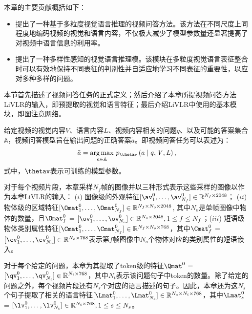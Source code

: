 本章的主要贡献概括如下：
\begin{itemize}
\item 提出了一种基于多粒度视觉语言推理的视频问答方法。该方法在不同尺度上同程度地编码视频的视觉和语言内容，不仅极大减少了模型参数量还显著提高了对视频中语言信息的利用率。
\item 提出了一种多样性感知的视觉语言推理模。该模块在多粒度视觉语言表征整合时可以有效地保持不同表征的判别性并自适应地学习不同表征的重要性，以应对多种多样的问题。
\end{itemize}




本节首先描述了视频问答任务的正式定义；然后介绍了本章所提视频问答方法LiVLR的输入，即预提取的视觉和语言特征；最后介绍LiVLR中使用的基本模块，即图注意网络。


给定视频的视觉内容$\mathit{V}$、语言内容$\mathit{L}$、视频内容相关的问题$\mathit{q}$、以及可能的答案集合$\mathbb{A}$，视频问答模型旨在输出问题的正确答案$\tilde{a}$。即视频问答任务可以表述为：
\begin{equation} 
\tilde{a} = \underset{a \in \mathbb{A}}{\arg \max}~p_{\thetav}\left(a \mid q,\mathit{V}, \mathit{L}\right), 
\end{equation} 
式中，$\thetav$表示可训练的模型参数。


对于每个视频片段，本章采样$N_f$帧的图像并以三种形式表示这些采样的图像以作为本章LiVLR的输入： 
($i$) 图像级的外观特征$[\av_{1}^{0}, \dots, \av_{N_f}^{0}] \in \mathbb{R}^{N_f \times \text{2048}}$； ($ii$) 物体级的区域特征$[\Omat_{1}^{0}, \dots, \Omat_{N_f}^{0}] \in \mathbb{R}^{N_f \times N_o \times \text{2048}}$, 其中$N_o$是单帧图像中物体的数量，且$\Omat_f^{0}$ = $[\ov_1^{0}, \dots, \ov_{N_o}^{0}] \in \mathbb{R}^{N_o \times \text{2048}}, 1\leq f\leq N_f$；($iii$) 短语级物体类别属性特征$[\Cmat_{1}^{0}, \dots, \Cmat_{N_f}^{0}]\in \mathbb{R}^{N_f \times N_o \times \text{768}}$，其中$\Cmat_f^{0}$ = $[\cv_1^{0}, \dots, \cv_{N_o}^{0}] \in \mathbb{R}^{N_o \times \text{768}}$表示第$f$帧图像中$N_o$个物体对应的类别属性的短语嵌入。


对于每个给定的问题，本章为其提取了token级的特征$\Qmat^{0}$ = $[\qv_1^{0}, \dots, \qv_{N_t}^{0}] \in \mathbb{R}^{N_t \times \text{768}}$，其中$N_t$表示该问题句子中token的数量。除了给定的问题之外，每个视频片段还有$N_s$个对应的语言描述的句子。因此，本章还为这$N_s$个句子提取了相关的语言特征$[\Lmat^{0}_{1}, \dots, \Lmat^{0}_{N_s}] \in \mathbb{R}^{N_s\times N_t\times \text{768}}$，其中$\Lmat_s^{0}$ = $[\lv_1^{0}, \dots, \lv_{N_t}^{0}] \in \mathbb{R}^{N_t \times \text{768}}, 1\leq s\leq N_s$。


